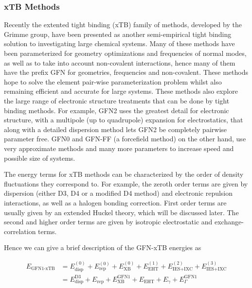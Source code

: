 \subsubsection{xTB Methods}

Recently the extented tight binding (xTB) family of methods, developed by the Grimme 
group, have been presented as another semi-empirical tight binding solution to investigating 
large chemical systems\cite{Bannwarth2020}\cite{Bannwarth2019}\cite{Grimme2017}\cite{Pracht2019}\cite{Grimme2016}\cite{Spicher2020a}.
Many of these methods have been parameterized for geometry optimizations and frequencies 
of normal modes, as well as to take into account non-covalent interactions, hence 
many of them have the prefix GFN for geometries, frequencies and non-covalent. These 
methods hope to solve the element pair-wise parameterization problem whilst also 
remaining efficient and accurate for large systems. These methods also explore the 
large range of electronic structure treatments that can be done by tight binding 
methods. For example, GFN2 uses the greatest detail for electronic structure, with 
a multipole (up to quadrupole) expansion for electrostatics, that along with a detailed 
dispersion method lets GFN2 be completely pairwise parameter free. GFN0 and GFN-FF (a forcefield method) on the other hand, use very approximate methods and many more parameters to increase speed and possible size of systems.

The energy terms for xTB methods can be characterized by the order of density fluctuations 
they correspond to. For example, the zeroth order terms are given by dispersion 
(either D3\cite{Grimme2010}, D4\cite{Caldeweyher2020} or a modified D4 method) and
electronic repulsion interactions, as well as a halogen bonding correction. First 
order terms are usually given by an extended Huckel theory, which will be discussed 
later. The second and higher order terms are given by isotropic electrostatic and 
exchange-correlation terms.

Hence we can give a brief description of the GFN-xTB energies as

\newcommand{\orderE}[2]{E^{\left(#1\right)}_{#2}}
\newcommand{\nameE}[2]{E^{#1}_{#2}}
\begin{equation}
\begin{aligned}
E_{\text{GFN1-xTB}} &= \orderE{0}{\text{disp}} + \orderE{0}{\text{rep}} + \orderE{0}{\text{XB}} + \orderE{1}{\text{EHT}} + \orderE{2}{\text{IES+IXC}} + \orderE{3}{\text{IES+IXC}} \\
&= \nameE{\text{D3}}{\text{disp}} + \nameE{}{\text{rep}} + \nameE{\text{GFN1}}{\text{XB}} + \nameE{}{\text{EHT}} + \nameE{}{\gamma} + \nameE{\text{GFN1}}{\Gamma}
\end{aligned}
\end{equation}

